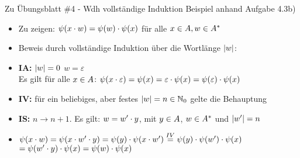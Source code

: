 \begin{frame}{Zu Übungsblatt \#4 - Wdh vollständige Induktion}
	Beispiel anhand Aufgabe 4.3b)
	\begin{itemize}[<+->]
		\item Zu zeigen: $\psi(x\cdot w) = \psi(w) \cdot \psi(x)$ für alle $x\in A, w\in A^*$
		\item Beweis durch vollständige Induktion über die Wortlänge $\left\lvert w \right\rvert$:
		\item[] \textbf{IA:} $\left\lvert w \right\rvert = 0$ \impl $w = \varepsilon$\\
			\quad Es gilt für alle $x\in A$: $\psi(x\cdot \varepsilon) = \psi(x) = \varepsilon \cdot \psi(x) =  \psi(\varepsilon) \cdot \psi(x)$
		\item[] \textbf{IV:} für ein beliebiges, aber festes $\left\lvert w \right\rvert = n \in \mathbb{N}_0$ gelte die Behauptung
		\item[] \textbf{IS:}  $n \rightarrow n + 1$. Es gilt: $w = w' \cdot y$, mit $y\in A$, $w\in A^*$ und $\left\lvert w' \right\rvert = n$
		\item[] \quad $\psi(x \cdot w) = \psi(x \cdot w' \cdot y) = \psi(y) \cdot \psi(x\cdot w') \stackrel{IV}{=} \psi(y) \cdot \psi(w') \cdot \psi(x)$\\
			\quad $= \psi(w' \cdot y) \cdot \psi(x) = \psi(w) \cdot \psi(x)$ 
	\end{itemize}
\end{frame}





